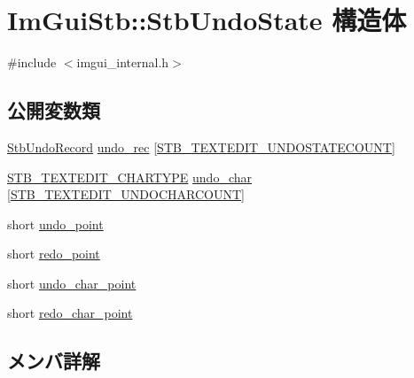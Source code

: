 \hypertarget{struct_im_gui_stb_1_1_stb_undo_state}{}\section{Im\+Gui\+Stb\+:\+:Stb\+Undo\+State 構造体}
\label{struct_im_gui_stb_1_1_stb_undo_state}


{\ttfamily \#include $<$imgui\+\_\+internal.\+h$>$}

\subsection*{公開変数類}
\begin{DoxyCompactItemize}
\item 
\mbox{\hyperlink{struct_im_gui_stb_1_1_stb_undo_record}{Stb\+Undo\+Record}} \mbox{\hyperlink{struct_im_gui_stb_1_1_stb_undo_state_a3cba4c0766038584aa310a52e763bbda}{undo\+\_\+rec}} \mbox{[}\mbox{\hyperlink{stb__textedit_8h_afa79483143df87a1497010712b3dfaf9}{S\+T\+B\+\_\+\+T\+E\+X\+T\+E\+D\+I\+T\+\_\+\+U\+N\+D\+O\+S\+T\+A\+T\+E\+C\+O\+U\+NT}}\mbox{]}
\item 
\mbox{\hyperlink{stb__textedit_8h_a6e64031a061922e3a48d88fd8623f4c3}{S\+T\+B\+\_\+\+T\+E\+X\+T\+E\+D\+I\+T\+\_\+\+C\+H\+A\+R\+T\+Y\+PE}} \mbox{\hyperlink{struct_im_gui_stb_1_1_stb_undo_state_ad0f20ff04903ecdf613b8ad083937bbd}{undo\+\_\+char}} \mbox{[}\mbox{\hyperlink{stb__textedit_8h_a15cbcac55cf92003c28c44734422756a}{S\+T\+B\+\_\+\+T\+E\+X\+T\+E\+D\+I\+T\+\_\+\+U\+N\+D\+O\+C\+H\+A\+R\+C\+O\+U\+NT}}\mbox{]}
\item 
short \mbox{\hyperlink{struct_im_gui_stb_1_1_stb_undo_state_a594ee4720e8280db9595f2d5419a279c}{undo\+\_\+point}}
\item 
short \mbox{\hyperlink{struct_im_gui_stb_1_1_stb_undo_state_a6562a15b41f003f411253fe34ca81612}{redo\+\_\+point}}
\item 
short \mbox{\hyperlink{struct_im_gui_stb_1_1_stb_undo_state_aab20994d092277b9d590d24ff7667bae}{undo\+\_\+char\+\_\+point}}
\item 
short \mbox{\hyperlink{struct_im_gui_stb_1_1_stb_undo_state_a78a5419b9c8278da078ed7acd2daac23}{redo\+\_\+char\+\_\+point}}
\end{DoxyCompactItemize}


\subsection{メンバ詳解}
\mbox{\label{struct_im_gui_stb_1_1_stb_undo_state_a78a5419b9c8278da078ed7acd2daac23}} 
